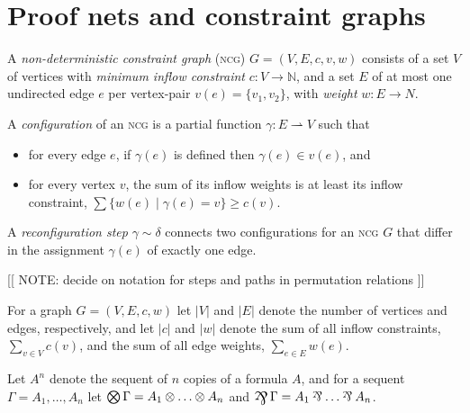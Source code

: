 \section{Proof nets and constraint graphs}


\newcommand\itn[1]{\llbracket#1\rrbracket}
\newcommand\coitn[1]{\llparenthesis#1\rrparenthesis}

\begin{definition}
A \emph{non-deterministic constraint graph} (\textsc{ncg}) $G=(V,E,c,v,w)$ consists of a set $V$ of vertices with \emph{minimum inflow constraint} $c\colon V\to\mathbb N$, and a set $E$ of at most one undirected edge $e$ per vertex-pair $v(e)=\{v_1,v_2\}$, with \emph{weight} $w\colon E\to N$.

A \emph{configuration} of an \textsc{ncg} is a partial function $\gamma\colon E\rightharpoonup V$ such that
\begin{itemize}
	\item
for every edge $e$, if $\gamma(e)$ is defined then $\gamma(e)\in v(e)$, and
	\item
for every vertex $v$, the sum of its inflow weights is at least its inflow constraint, $\sum\{w(e)\mid \gamma(e)=v\}\geq c(v)$.
\end{itemize}

A \emph{reconfiguration step} $\gamma\sim\delta$ connects two configurations for an \textsc{ncg} $G$ that differ in the assignment $\gamma(e)$ of exactly one edge.

\end{definition}



[[ NOTE: decide on notation for steps and paths in permutation relations ]]

For a graph $G=(V,E,c,w)$ let $|V|$ and $|E|$ denote the number of vertices and edges, respectively, and let $|c|$ and $|w|$ denote the sum of all inflow constraints, $\sum_{v\in V}c(v)$, and the sum of all edge weights, $\sum_{e\in E}w(e)$.


Let $A^n$ denote the sequent of $n$ copies of a formula $A$, and for a sequent $\Gamma=A_1,\dotsc,A_n$ let $\bigotimes\Gamma=A_1\otimes\dotso\otimes A_n$ and $\bigparr\Gamma=A_1\parr\dotso\parr A_n$.



